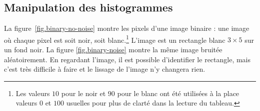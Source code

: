 \subsection{Manipulation des histogrammes}

La figure~\ref{fig.binary-no-noise} montre les pixels d'une image binaire : une image où chaque pixel est soit noir, soit blanc.\footnote{Les valeurs $10$ pour le noir et $90$ pour le blanc ont été utilisées à la place valeurs $0$ et $100$ usuelles pour plus de clarté dans la lecture du tableau.} L'image est un rectangle blanc $3\times 5$ sur un fond noir. La figure \ref{fig.binary-noise} montre la même image bruitée aléatoirement. En regardant l'image, il est possible d'identifier le rectangle, mais c'est très difficile à faire et le lissage de l'image n'y changera rien.

